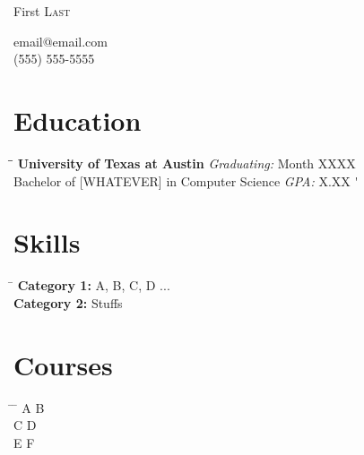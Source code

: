 \documentclass[a4paper,10pt]{article}
\newcommand{\leftindent}{.25in}
\newcommand{\middleindent}{3in}
\newcommand{\rightindent}{6.75in}
\newcommand{\sectionseparation}{-.05in}
\begin{document}
\pagestyle{empty} %

\begin{center}
\par{\Huge First \textsc{Last}\par}
email@email.com \\
(555) 555-5555
\end{center}

\section{Education} 
\begin{tabbing}
\hspace{\leftindent} \= \hspace{\rightindent}\= \kill %
\>\textbf{University of Texas at Austin} \> \textit{Graduating:} Month XXXX \' \\
\>Bachelor of [WHATEVER] in Computer Science \> \textit{GPA:} X.XX \' 
\end{tabbing}

\vspace{\sectionseparation}
\section{Skills} 
\begin{tabbing}
\hspace{\leftindent} \= \kill %
\>\textbf{Category 1:} A, B, C, D ... \\
\>\textbf{Category 2:} Stuffs
\end{tabbing}

\vspace{\sectionseparation}
\section{Courses} 
\begin{tabbing}
\hspace{\leftindent} \= \hspace{\middleindent} \= \kill %
\>A \> B \\
\>C \> D \\
\>E \> F
\end{tabbing}

\vspace{\sectionseparation}
\end{document}

